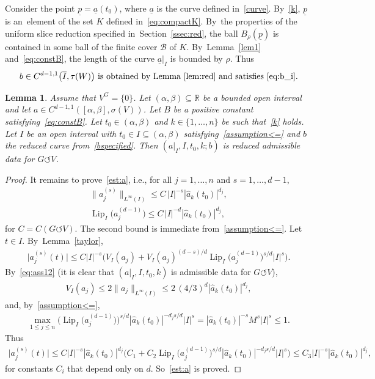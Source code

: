 \documentclass[pdftex]{sigma}
\numberwithin{equation}{section}
\newtheorem{Lemma}[Theorem]{Lemma}
\def\al{\alpha}
\def\be{\beta}
\def\rh{\rho}
\def\si{\sigma}
\def\ta{\tau}
\def\R{\mathbb{R}}
\def\cB{\mathcal{B}}
\def\ol{\overline}
\def\ul{\underline}
\def\Lip{\on{Lip}}
\def\const{M}
\def\we{\hat}
\def\acts{\circlearrowleft}
\let\on=\operatorname
\begin{document}
Consider the point $\underline p = \ul a(t_0)$, where $\ul a$ is the curve defined in~\eqref{curve}. By~\eqref{k},
$\underline p$ is an~ele\-ment of the set $K$ defined in~\eqref{eq:compactK}. By~the properties of the uniform slice reduction specified in~Section~\ref{ssec:red},
the ball $B_\rh(\underline p)$ is contained in some ball of the finite cover $\cB$ of $K$. By~Lemma~\ref{lem1} and~\eqref{eq:constB},
the length of the curve $\ul a|_I$ is bounded by $\rh$.
Thus
\begin{gather} \label{bspecified}
 \text{$b \in C^{d-1,1}\big(\ol I,\ta(W)\big)$ is obtained by Lemma~\ref{lem:red} and satisfies~\eqref{eq:b_i}.}
\end{gather}




\begin{Lemma} \label{lem:assThm1implyassProp3}
	Assume that $V^G = \{0\}$.
 Let $(\al,\be) \subseteq \R$ be a bounded open interval and let $a \in C^{d-1,1}([\al,\be],\si(V))$.
 Let $B$ be a positive constant satisfying~\eqref{eq:constB}.
 Let $t_0 \in (\al,\be)$ and $k \in \{1,\dots,n\}$ be such that~\eqref{k} holds.
 Let $I$ be an open interval with $t_0 \in I \subseteq (\al,\be)$ satisfying~\eqref{assumption<=}
 and $b$ the reduced curve from~\eqref{bspecified}.
 Then $(a|_I,I,t_0,k;b)$ is reduced admissible data for $G \acts V$.
\end{Lemma}

\begin{proof}
	It remains to prove~\eqref{est:a}, i.e.,
	for all
	$ j = 1,\dots,n$ and $ s = 1,\dots,d-1$,
 \begin{gather*}%
 \big\|a_j^{(s)} \big\|_{L^\infty(I)} \le C\, |I|^{-s} |\we a_k (t_0)|^{d_j},
 \\
 \Lip_I \big(a_j^{(d-1)}\big) \le C\, |I|^{-d} |\we a_k (t_0)|^{d_j},
 \end{gather*}	
 for $C = C(G \acts V)$.	
 The second bound is immediate from~\eqref{assumption<=}.
Let $t \in I$. By~Lemma~\ref{taylor},
 \begin{gather*}
 \big| a_j^{(s)}(t) \big| \le C |I|^{-s} \bigl( V_I(a_j)
 + V_I(a_j)^{(d-s)/d} \Lip_I\big(a_j^{(d-1)}\big)^{s/d} |I|^s\bigr).
 \end{gather*}
By~\eqref{eq:ass12} (it is clear that $(a|_I,I,t_0,k)$ is admissible data for $G \acts V$),
\begin{gather*}
 V_I(a_j) \le 2 \|a_j\|_{L^{\infty}(I)} \le 2\, (4/3)^d |\we a_k (t_0)|^{d_j},
\end{gather*}
and, by~\eqref{assumption<=},
\begin{gather*}
 \max_{1 \le j\le n} \big(\Lip_I\big(a_j^{(d-1)}\big)\big)^{s/d} |\we a_k (t_0)|^{-d_j s/d} |I|^s
 = |\we a_k (t_0)|^{-s} \const^s |I|^s \le 1.
\end{gather*}
Thus
\begin{gather*}
\big | a_j^{(s)}(t) \big| \le C |I|^{-s}
 |\we a_k (t_0)|^{d_j} \big(C_1 + C_2 \Lip_I\big(a_j^{(d-1)}\big)^{s/d} |\we a_k (t_0)|^{-d_j s/d} |I|^s \big)
\le C_3 |I|^{-s} |\we a_k (t_0)|^{d_j},
\end{gather*}
for constants $C_i$ that depend only on $d$.
So~\eqref{est:a} is proved.
\end{proof}
\end{document}
